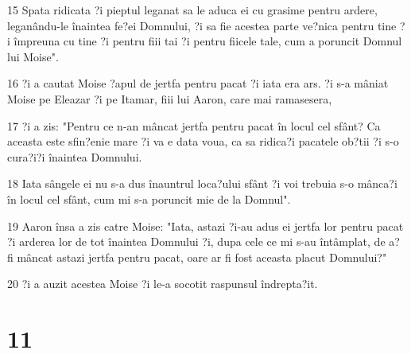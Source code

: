 \par 15 Spata ridicata ?i pieptul leganat sa le aduca ei cu grasime pentru ardere, leganându-le înaintea fe?ei Domnului, ?i sa fie acestea parte ve?nica pentru tine ?i împreuna cu tine ?i pentru fiii tai ?i pentru fiicele tale, cum a poruncit Domnul lui Moise".
\par 16 ?i a cautat Moise ?apul de jertfa pentru pacat ?i iata era ars. ?i s-a mâniat Moise pe Eleazar ?i pe Itamar, fiii lui Aaron, care mai ramasesera,
\par 17 ?i a zis: "Pentru ce n-an mâncat jertfa pentru pacat în locul cel sfânt? Ca aceasta este sfin?enie mare ?i va e data voua, ca sa ridica?i pacatele ob?tii ?i s-o cura?i?i înaintea Domnului.
\par 18 Iata sângele ei nu s-a dus înauntrul loca?ului sfânt ?i voi trebuia s-o mânca?i în locul cel sfânt, cum mi s-a poruncit mie de la Domnul".
\par 19 Aaron însa a zis catre Moise: "Iata, astazi ?i-au adus ei jertfa lor pentru pacat ?i arderea lor de tot înaintea Domnului ?i, dupa cele ce mi s-au întâmplat, de a? fi mâncat astazi jertfa pentru pacat, oare ar fi fost aceasta placut Domnului?"
\par 20 ?i a auzit acestea Moise ?i le-a socotit raspunsul îndrepta?it.

\chapter{11}

